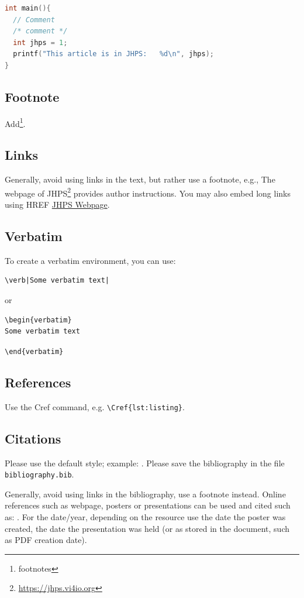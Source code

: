 \documentclass{jhps}
\begin{document}
\begin{lstfloat}
  \begin{lstlisting}[caption="My longer listing",label=lst:longlisting,language=C]
int main(){
  // Comment
  /* comment */
  int jhps = 1;
  printf("This article is in JHPS:   %d\n", jhps);
}
  \end{lstlisting}
\end{lstfloat}


\subsection{Footnote}
Add\footnote{footnotes}.

\subsection{Links}
Generally, avoid using links in the text, but rather use a footnote, e.g.,
The webpage of JHPS\footnote{\url{https://jhps.vi4io.org}} provides author instructions.
You may also embed long links using HREF \href{https://jhps.vi4io.org}{JHPS Webpage}.

\subsection{Verbatim}
To create a verbatim environment, you can use:
\begin{verbatim}
\verb|Some verbatim text|
\end{verbatim}
or
\begin{verbatim}
\begin{verbatim}
Some verbatim text
\end{verbatim}
\vspace*{-0.8em}
\verb|\end{verbatim}|

\subsection{References}

Use the Cref command, e.g. \verb|\Cref{lst:listing}|.\subsection{Citations}

Please use the default style; example: \cite{misc1998}.
Please save the bibliography in the file \texttt{bibliography.bib}.

Generally, avoid using links in the bibliography, use a footnote instead.
Online references such as webpage, posters or presentations can be used and cited such as: \cite{link20pres, link20post, link20web}.
For the date/year, depending on the resource use the date the poster was created, the date the presentation was held (or as stored in the document, such as PDF creation date).
\end{document}

